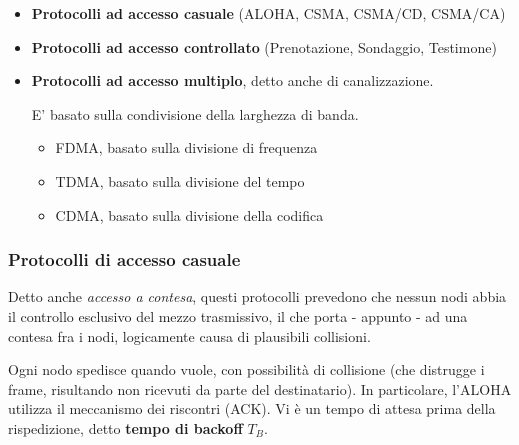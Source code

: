         \begin{itemize}
            \item 
                \textbf{Protocolli ad accesso casuale} (ALOHA, CSMA, CSMA/CD, CSMA/CA)
                
            \item 
                \textbf{Protocolli ad accesso controllato} (Prenotazione, Sondaggio, Testimone)
                
            \item 
                \textbf{Protocolli ad accesso multiplo}, detto anche di canalizzazione. 
                
                E' basato sulla condivisione della larghezza di banda.
                
                \begin{itemize}
                    \item 
                        FDMA, basato sulla divisione di frequenza
                    
                    \item 
                        TDMA, basato sulla divisione del tempo
                        
                    \item 
                        CDMA, basato sulla divisione della codifica
                \end{itemize}
        \end{itemize}
            
        \subsubsection{Protocolli di accesso casuale}
        
            Detto anche \textit{accesso a contesa}, questi protocolli prevedono che nessun nodi abbia il controllo esclusivo del mezzo trasmissivo, il che porta - appunto - ad una contesa fra i nodi, logicamente causa di plausibili collisioni.
            
            
                Ogni nodo spedisce quando vuole, con possibilità di collisione (che distrugge i frame, risultando non ricevuti da parte del destinatario). In particolare, l'ALOHA utilizza il meccanismo dei riscontri (ACK). Vi è un tempo di attesa prima della rispedizione, detto \textbf{tempo di backoff} $T_B$. 
                
